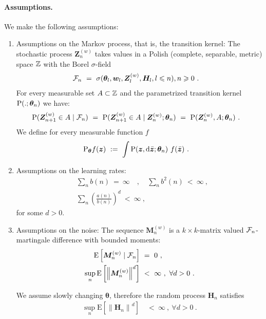 \documentclass{article}
\newcommand\Bw{\bm{w}}
\newcommand\Bz{\bm{z}}
\newcommand\BH{\bm{H}}
\newcommand\BM{\bm{M}}
\newcommand\BZ{\bm{Z}}
\newcommand\Bth{\bm{\theta}}
\newcommand{\rE}{\mathrm{E}} \newcommand{\rF}{\mathrm{F}}
\renewcommand{\leq}{\leqslant}
\renewcommand{\geq}{\geqslant}
\begin{document}
\paragraph{Assumptions.}
We make the following assumptions:
\begin{enumerate}[label=\textbf{(A\arabic*)}]
\item Assumptions on the Markov process, that is, the transition kernel:
The stochastic process $\BZ^{(w)}_n$ takes values
in a Polish (complete, separable, metric) space $\mathbb{Z}$
with the Borel $\sigma$-field
\begin{align} \nonumber
\cF_n \ &= \
\sigma(\Bth_l, \Bw_l, \BZ^{(w)}_l,\BH_l,
l \leq n), n \geq 0 \ .
\end{align}
For every measurable set $A \subset \mathbb{Z}$ and the parametrized transition kernel
$\rP(.;\Bth_n)$ we have:
\begin{align}
\rP(\BZ^{(w)}_{n+1} \in A \mid \cF_n) \ &= \
\rP(\BZ^{(w)}_{n+1} \in A \mid  \BZ^{(w)}_n;\Bth_n ) \ = \
\rP(\BZ^{(w)}_n ,A ; \Bth_n ) \ .
\end{align}
We define for every measurable function $f$
\begin{align} \nonumber
\rP_{\Bth}f(\Bz) \ &:= \ \int \rP(\Bz ,\Rd \bar{\Bz} ; \Bth_n )
\ f( \bar{\Bz}) \ .
\end{align}

\item
Assumptions on the learning rates:
\begin{align}
&\sum_{n} b(n) \ = \ \infty \quad , \quad
\sum_{n} b^2(n) \ < \ \infty \ , \\
&\sum_{n} \left(\frac{a(n)}{b(n)}\right)^d \ < \ \infty \ ,
\end{align}
for some $d>0$.


\item Assumptions on the noise:
The sequence $\BM^{(w)}_{n}$ is a $k \times k$-matrix valued
$\mathcal{F}_n$-martingale difference with bounded moments:
\begin{align}
\rE \left[\BM^{(w)}_{n} \mid  \cF_n\right] \ &= \ 0 \ , \\
\sup_n \rE \left[\left\|\BM^{(w)}_{n} \right\|^d \right] \ &< \ \infty
  \ , \ \forall d > 0 \ .
\end{align}

We assume slowly changing $\Bth$, therefore the random process $\BH_n$
satisfies
\begin{align}
\sup_n \rE \left[\left\|\BH_{n} \right\|^d \right] \ &< \ \infty
  \ , \ \forall d > 0 \ .
\end{align}


\end{enumerate}
\end{document}

